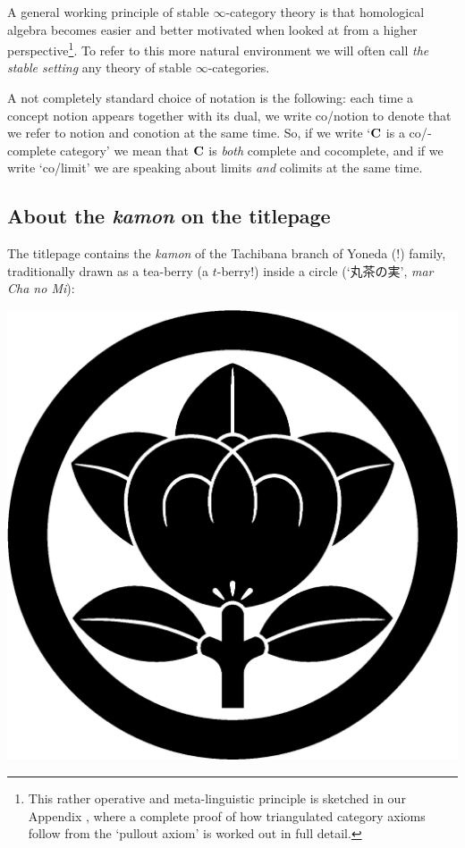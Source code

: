 A general working principle of stable $\infty$\hyp{}category theory is that homological algebra becomes easier and better motivated when looked at from a higher perspective\footnote{This rather operative and meta\hyp{}linguistic principle is sketched in our Appendix , where a complete proof of how triangulated category axioms follow from the `pullout axiom'  is worked out in full detail.}. To refer to this more natural environment we will often call \emph{the stable setting} any theory of stable $\infty$\hyp{}categories.

A not completely standard choice of notation is the following: each time a concept {\sf notion} appears together with its dual, we write {\sf co}\fshyp{}{\sf notion} to denote that we refer to {\sf notion} and {\sf conotion} at the same time. So, if we write `$\mathbf{C}$ is a co\fshyp{}complete category' we mean that $\mathbf{C}$ is \emph{both} complete and cocomplete, and if we write `co\fshyp{}limit' we are speaking about limits \emph{and} colimits at the same time.
\subsection*{About the \emph{kamon} on the titlepage}
The titlepage contains the \emph{kamon} of the Tachibana branch of Yoneda (!) family, traditionally drawn \cite{Samurai} as a tea\hyp{}berry (a $t$\hyp{}berry!) inside a circle (`{\japanese 丸茶の実}', \emph{mar Cha no Mi}):
\begin{center}
\includegraphics[scale=.05]{marunitachibana}
\end{center}

